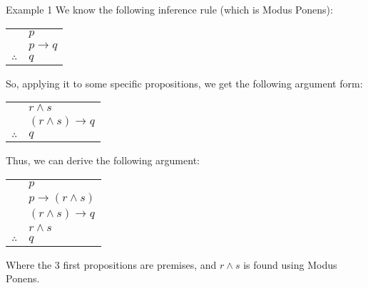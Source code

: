 \documentclass{article}
\begin{document}
\begin{parag}{Example 1}
    We know the following inference rule (which is Modus Ponens):
    \begin{center}
    \begin{tabular}{rl}
        & $p$ \\
        & $p \to q$ \\
        \hline
        $\therefore$ & $q$
    \end{tabular}
    \end{center}

    So, applying it to some specific propositions, we get the following argument form: 
    \begin{center}
    \begin{tabular}{rl}
        & $r \land s$ \\
        & $\left(r \land s\right) \to q$ \\
        \hline
        $\therefore$ & $q$
    \end{tabular}
    \end{center}

    Thus, we can derive the following argument:
    \begin{center}
    \begin{tabular}{rl}
        & $p$ \\
        & $p \to \left(r \land s\right)$ \\
        & $\left(r \land s\right) \to q$ \\
        & $r \land s$ \\
        \hline
        $\therefore$ & $q$
    \end{tabular}
    \end{center}

    Where the 3 first propositions are premises, and $r \land s$ is found using Modus Ponens.
\end{parag}
\end{document}
